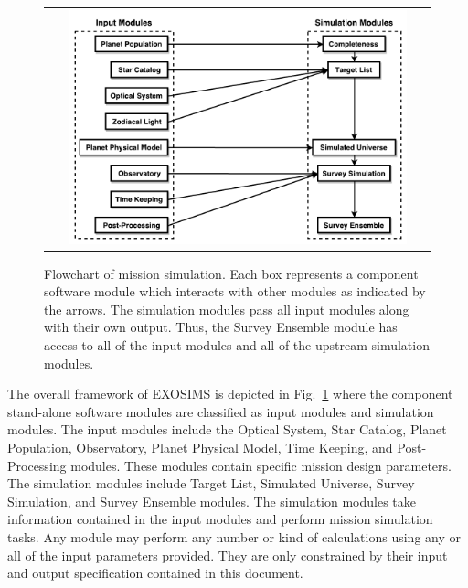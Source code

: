 \documentclass[cleanfoot]{asme2ej}
\begin{document}
\begin{figure}[ht]
    \begin{center}
        \begin{tabular}{c}
             \includegraphics[width=0.9\textwidth]{codeflow4}
        \end{tabular}
    \end{center}
    \caption{Flowchart of mission simulation. Each box represents a component software module which interacts with other modules as indicated by the arrows. The simulation modules pass all input modules along with their own output.  Thus, the Survey Ensemble module has access to all of the input modules and all of the upstream simulation modules.}
    \label{figure_framework}
\end{figure}

The overall framework of EXOSIMS is depicted in Fig.~\ref{figure_framework} where the component stand-alone software modules are classified as input modules and simulation modules.  The input modules include the Optical System, Star Catalog, Planet Population, Observatory, Planet Physical Model, Time Keeping, and Post-Processing modules.  These modules contain specific mission design parameters.  The simulation modules include Target List, Simulated Universe, Survey Simulation, and Survey Ensemble modules.  The simulation modules take information contained in the input modules and perform mission simulation tasks.  Any module may perform any number or kind of calculations using any or all of the input parameters provided.  They are only constrained by their input and output specification contained in this document.
\end{document}
